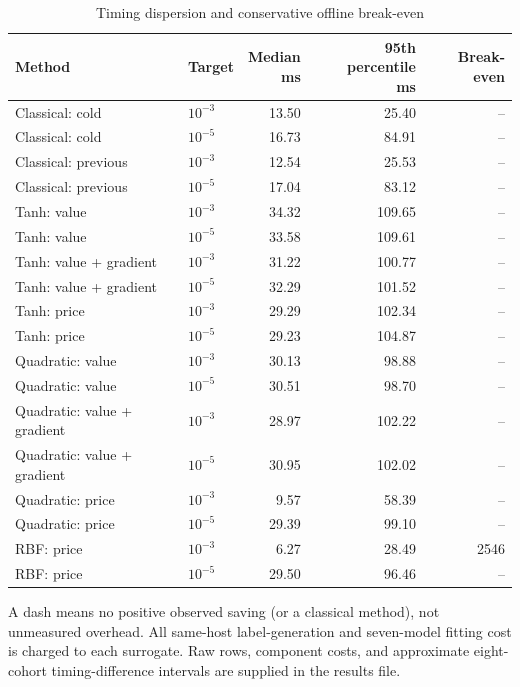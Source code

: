 \begin{table}[p]
\centering
\caption{Timing dispersion and conservative offline break-even}\label{tab:r19-cost-details}
\setlength{\tabcolsep}{4pt}
\begin{tabular}{llrrr}
\toprule
Method & Target & \shortstack{Median\\ms} & \shortstack{95th percentile\\ms} & Break-even \\
\midrule
Classical: cold & $10^{-3}$ & 13.50 & 25.40 & -- \\
Classical: cold & $10^{-5}$ & 16.73 & 84.91 & -- \\
Classical: previous & $10^{-3}$ & 12.54 & 25.53 & -- \\
Classical: previous & $10^{-5}$ & 17.04 & 83.12 & -- \\
Tanh: value & $10^{-3}$ & 34.32 & 109.65 & -- \\
Tanh: value & $10^{-5}$ & 33.58 & 109.61 & -- \\
Tanh: value + gradient & $10^{-3}$ & 31.22 & 100.77 & -- \\
Tanh: value + gradient & $10^{-5}$ & 32.29 & 101.52 & -- \\
Tanh: price & $10^{-3}$ & 29.29 & 102.34 & -- \\
Tanh: price & $10^{-5}$ & 29.23 & 104.87 & -- \\
Quadratic: value & $10^{-3}$ & 30.13 & 98.88 & -- \\
Quadratic: value & $10^{-5}$ & 30.51 & 98.70 & -- \\
Quadratic: value + gradient & $10^{-3}$ & 28.97 & 102.22 & -- \\
Quadratic: value + gradient & $10^{-5}$ & 30.95 & 102.02 & -- \\
Quadratic: price & $10^{-3}$ & 9.57 & 58.39 & -- \\
Quadratic: price & $10^{-5}$ & 29.39 & 99.10 & -- \\
RBF: price & $10^{-3}$ & 6.27 & 28.49 & 2546 \\
RBF: price & $10^{-5}$ & 29.50 & 96.46 & -- \\
\bottomrule
\end{tabular}

\par\medskip\begin{minipage}{\textwidth}A dash means no positive observed saving (or a classical method), not unmeasured overhead. All same-host label-generation and seven-model fitting cost is charged to each surrogate. Raw rows, component costs, and approximate eight-cohort timing-difference intervals are supplied in the results file.\end{minipage}
\end{table}
